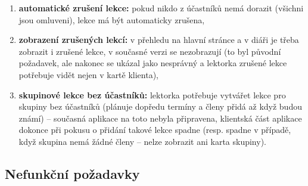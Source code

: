 \begin{enumerate}[label=\textbf{F\arabic*}]
    \item \label{F19} \textbf{automatické zrušení lekce:} pokud nikdo z účastníků nemá dorazit (všichni jsou omluveni), lekce má být automaticky zrušena,
    \item \label{F20} \textbf{zobrazení zrušených lekcí:} v přehledu na hlavní stránce a v diáři je třeba zobrazit i zrušené lekce, v současné verzi se nezobrazují (to byl původní požadavek, ale nakonec se ukázal jako nesprávný a lektorka zrušené lekce potřebuje vidět nejen v kartě klienta),
    \item \label{F21} \textbf{skupinové lekce bez účastníků:} lektorka potřebuje vytvářet lekce pro skupiny bez účastníků (plánuje dopředu termíny a členy přidá až když budou známí) -- současná aplikace na toto nebyla připravena, klientská část aplikace dokonce při pokusu o přidání takové lekce spadne (resp. spadne v případě, když skupina nemá žádné členy -- nelze zobrazit ani karta skupiny).
\end{enumerate}

\subsection{Nefunkční požadavky}

